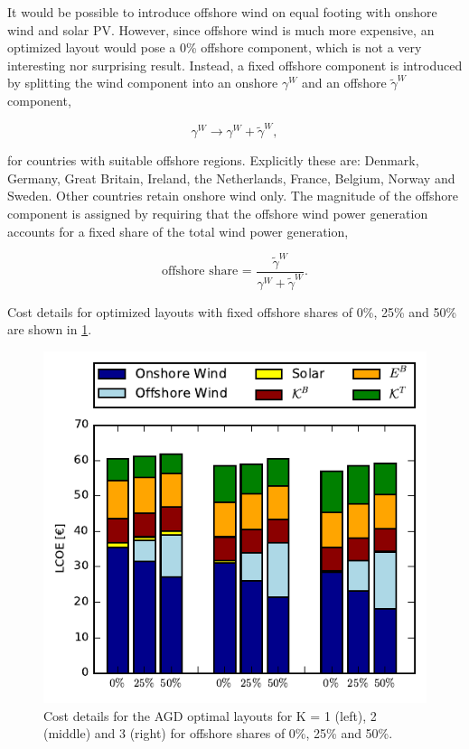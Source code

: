 \documentclass[a4paper, 5p, sort&compress]{elsarticle}%
\begin{document}
It would be possible to introduce offshore wind on equal footing with
onshore wind and solar PV. However, since offshore wind is much more
expensive, an optimized layout would pose a 0\% offshore component,
which is not a very interesting nor surprising result. Instead, a
fixed offshore component is introduced by splitting the wind component
into an onshore $\gamma^{W}$ and an offshore $\tilde{\gamma}^{W}$ component,

\begin{equation}
  \label{eq:11}
  \gamma^{W} \to \gamma^{W} + \tilde{\gamma}^{W}, 
\end{equation}

for countries with suitable offshore regions. Explicitly these are:
Denmark, Germany, Great Britain, Ireland, the Netherlands, France,
Belgium, Norway and Sweden. Other countries retain onshore wind
only. The magnitude of the offshore component is assigned by requiring
that the offshore wind power generation accounts for a fixed share of
the total wind power generation,

\begin{equation}
  \label{eq:12}
  \text{offshore share = }\frac{\tilde{\gamma}^W}{\gamma^{W} + \tilde{\gamma}^W}.
\end{equation}

Cost details for optimized layouts with fixed offshore shares of 0\%, 25\% and
50\% are shown in \cref{fig:cost-offshore}.

\begin{figure}[h!]
  \centering
  \includegraphics[width = \columnwidth]{costOffshoreVE50}
  \caption{Cost details for the AGD optimal layouts for K = 1 (left),
    2 (middle) and 3 (right) for offshore shares of 0\%, 25\% and 50\%.}
  \label{fig:cost-offshore}
\end{figure}
\end{document}
